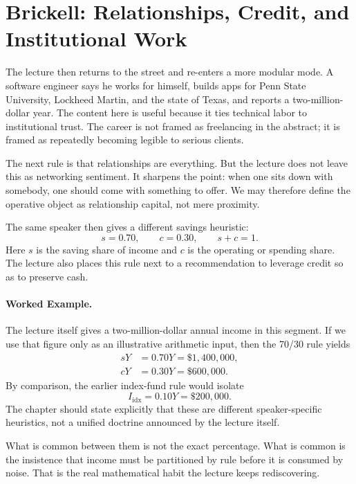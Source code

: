 \section{Brickell: Relationships, Credit, and Institutional Work}

The lecture then returns to the street and re-enters a more modular mode. A software engineer says he works for himself, builds apps for Penn State University, Lockheed Martin, and the state of Texas, and reports a two-million-dollar year. The content here is useful because it ties technical labor to institutional trust. The career is not framed as freelancing in the abstract; it is framed as repeatedly becoming legible to serious clients.

The next rule is that relationships are everything. But the lecture does not leave this as networking sentiment. It sharpens the point: when one sits down with somebody, one should come with something to offer. We may therefore define the operative object as relationship capital, not mere proximity.

The same speaker then gives a different savings heuristic:
\begin{equation}
s=0.70,\qquad c=0.30,\qquad s+c=1.
\end{equation}
Here $s$ is the saving share of income and $c$ is the operating or spending share. The lecture also places this rule next to a recommendation to leverage credit so as to preserve cash.

\paragraph{Worked Example.}
The lecture itself gives a two-million-dollar annual income in this segment. If we use that figure only as an illustrative arithmetic input, then the 70/30 rule yields
\begin{align}
sY &= 0.70Y = \$1{,}400{,}000,\\
cY &= 0.30Y = \$600{,}000.
\end{align}
By comparison, the earlier index-fund rule would isolate
\begin{equation}
I_{\mathrm{idx}} = 0.10Y = \$200{,}000.
\end{equation}
The chapter should state explicitly that these are different speaker-specific heuristics, not a unified doctrine announced by the lecture itself.

What is common between them is not the exact percentage. What is common is the insistence that income must be partitioned by rule before it is consumed by noise. That is the real mathematical habit the lecture keeps rediscovering.

